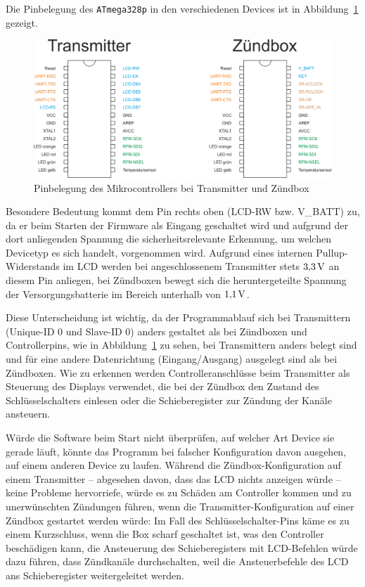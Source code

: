 \documentclass[pdftex, parskip, numbers=noenddot, toc=listof]{scrbook}
\begin{document}
	Die Pinbelegung des \texttt{ATmega328p} in den verschiedenen Devices ist in Abbildung~\ref{fig:pinout} gezeigt.

	\begin{figure}
		\centering
		\includegraphics[width=.7\textwidth]{Bilder/pinout}
		\caption{Pinbelegung des Mikrocontrollers bei Transmitter und Zündbox}
		\label{fig:pinout}
	\end{figure}

	Besondere Bedeutung kommt dem Pin rechts oben (LCD-RW bzw. V\_BATT) zu, da er beim Starten der Firmware als Eingang geschaltet wird und aufgrund der dort anliegenden Spannung die sicherheitsrelevante Erkennung, um welchen Devicetyp es sich handelt, vorgenommen wird. Aufgrund eines internen Pullup-Widerstands im LCD werden bei angeschlossenem Transmitter stets $\unit[3{,}3]{V}$ an diesem Pin anliegen, bei Zündboxen bewegt sich die heruntergeteilte Spannung der Versorgungsbatterie im Bereich unterhalb von $\unit[1{,}1]{V}$.

	Diese Unterscheidung ist wichtig, da der Programmablauf sich bei Transmittern (Unique-ID 0 und Slave-ID 0) anders gestaltet als bei Zündboxen und Controllerpins, wie in Abbildung~\ref{fig:pinout} zu sehen, bei Transmittern anders belegt sind und für eine andere Datenrichtung (Eingang/Ausgang) ausgelegt sind als bei Zündboxen.  Wie zu erkennen werden Controlleranschlüsse beim Transmitter als Steuerung des Displays verwendet, die bei der Zündbox den Zustand des Schlüsselschalters einlesen oder die Schieberegister zur Zündung der Kanäle ansteuern.

	Würde die Software beim Start nicht überprüfen, auf welcher Art Device sie gerade läuft, könnte das Programm bei falscher Konfiguration davon ausgehen, auf einem anderen Device zu laufen. Während die Zündbox-Konfiguration auf einem Transmitter -- abgesehen davon, dass das LCD nichts anzeigen würde -- keine Probleme hervorriefe, würde es zu Schäden am Controller kommen und zu unerwünschten Zündungen führen, wenn die Transmitter-Konfiguration auf einer Zündbox gestartet werden würde: Im Fall des Schlüsselschalter-Pins käme es  zu einem Kurzschluss, wenn die Box scharf geschaltet ist, was den Controller beschädigen kann, die Ansteuerung des Schieberegisters mit LCD-Befehlen würde dazu führen, dass Zündkanäle durchschalten, weil die Ansteuerbefehle des LCD ans Schieberegister weitergeleitet werden.
\end{document}
